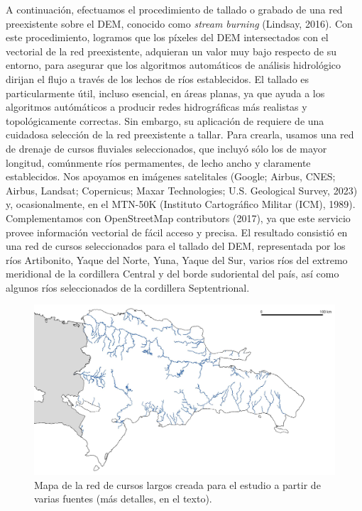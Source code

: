 \documentclass[spanish]{article}
\begin{document}
A continuación, efectuamos el procedimiento de tallado o grabado de una
red preexistente sobre el DEM, conocido como \emph{stream burning}
(Lindsay, 2016). Con este procedimiento, logramos que los píxeles del
DEM intersectados con el vectorial de la red preexistente, adquieran un
valor muy bajo respecto de su entorno, para asegurar que los algoritmos
automáticos de análisis hidrológico dirijan el flujo a través de los
lechos de ríos establecidos. El tallado es particularmente útil, incluso
esencial, en áreas planas, ya que ayuda a los algoritmos autómáticos a
producir redes hidrográficas más realistas y topológicamente correctas.
Sin embargo, su aplicación de requiere de una cuidadosa selección de la
red preexistente a tallar. Para crearla, usamos una red de drenaje de
cursos fluviales seleccionados, que incluyó sólo los de mayor longitud,
comúnmente ríos permamentes, de lecho ancho y claramente establecidos.
Nos apoyamos en imágenes satelitales (Google; Airbus, CNES; Airbus,
Landsat; Copernicus; Maxar Technologies; U.S. Geological Survey, 2023)
y, ocasionalmente, en el MTN-50K (Instituto Cartográfico Militar (ICM),
1989). Complementamos con OpenStreetMap contributors (2017), ya que este
servicio provee información vectorial de fácil acceso y precisa. El
resultado consistió en una red de cursos seleccionados para el tallado
del DEM, representada por los ríos Artibonito, Yaque del Norte, Yuna,
Yaque del Sur, varios ríos del extremo meridional de la cordillera
Central y del borde sudoriental del país, así como algunos ríos
seleccionados de la cordillera Septentrional.

\begin{figure}

{\centering \includegraphics[width=1\linewidth]{figuras/red-cursos-largos} 

}

\caption{Mapa de la red de cursos largos creada para el estudio a partir de varias fuentes (más detalles, en el texto).}\label{fig:redcursoslargos}
\end{figure}
\end{document}
